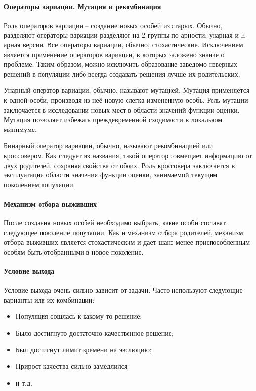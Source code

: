 \documentclass{fefu_thesis/cls/fefu}
\begin{document}
    \paragraph{Операторы вариации. Мутация и рекомбинация}
    Роль операторов вариации -- создание новых особей из старых. Обычно, разделяют операторы вариации разделяют на 2 группы по арности: унарная и n-арная версии. Все операторы вариации, обычно, стохастические. Исключением является применение операторов вариации, в которых заложено знание о проблеме. Таким образом, можно исключить образование заведомо неверных решений в популяции либо всегда создавать решения лучше их родительских.

    Унарный оператор вариации, обычно, называют мутацией. Мутация применяется к одной особи, производя из неё новую слегка измененную особь. Роль мутации заключается в исследовании новых мест в области значений функции оценки. Мутация позволяет избежать преждевременной сходимости в локальном минимуме.

    Бинарный оператор вариации, обычно, называют рекомбинацией или кроссовером. Как следует из названия, такой оператор совмещает информацию от двух родителей, сохраняя свойства от обоих. Роль кроссовера заключается в эксплуатации области значения функции оценки, занимаемой текущим поколением популяции.
    \paragraph{Механизм отбора выживших}
    После создания новых особей необходимо выбрать, какие особи составят следующее поколение популяции. Как и механизм отбора родителей, механизм отбора выживших является стохастическим и дает шанс менее приспособленным особям быть отобранными в новое поколение.
    \paragraph{Условие выхода}
    Условие выхода очень сильно зависит от задачи. Часто используют следующие варианты или их комбинации:
    \begin{itemize}
        \item Популяция сошлась к какому-то решение;
        \item Было достигнуто достаточно качественное решение;
        \item Был достигнут лимит времени на эволюцию;
        \item Прирост качества сильно замедлился;
        \item и т.д.
    \end{itemize}
\end{document}
